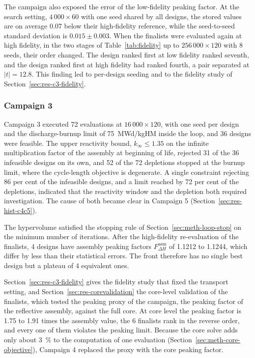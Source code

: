 The campaign also exposed the error of the low-fidelity peaking factor.
At the search setting, $4\,000\times60$ with one seed shared by all
designs, the stored values are on average 0.07 below their high-fidelity
reference, while the seed-to-seed standard deviation is
$0.015 \pm 0.003$.
When the finalists were evaluated again at high fidelity, in the two
stages of Table~\ref{tab:fidelity} up to $256\,000\times120$ with 8
seeds, their order changed. The design ranked first at low fidelity
ranked seventh, and the design ranked first at high fidelity had ranked
fourth, a pair separated at $|t| = 12.8$. This finding led to per-design
seeding and to the fidelity study of Section~\ref{sec:res-c3-fidelity}.

\subsubsection{Campaign 3}
\label{sec:res-hist-c3}
\label{sec:res-c3}\label{sec:res-c3doe}\label{tab:c3-census}\label{fig:c3-space}\label{sec:res-c3front}\label{fig:hv}\label{fig:plateau}\label{tab:c3-resolved}

Campaign 3 executed 72 evaluations at $16\,000\times120$, with one seed per
design and the discharge-burnup limit of \SI{75}{MWd/kgHM} inside the
loop, and 36 designs were feasible. The upper reactivity bound,
$k_\infty \le 1.35$ on the infinite multiplication factor of the assembly at beginning of life,
rejected 31 of the 36 infeasible designs on its own, and 52 of the 72
depletions stopped at the burnup limit, where the cycle-length
objective is degenerate. A single constraint rejecting 86 per cent of
the infeasible designs, and a limit reached by 72 per cent of the
depletions, indicated that the reactivity window and the depletion both
required investigation. The cause of both became clear in Campaign 5
(Section~\ref{sec:res-hist-c4c5}).

The hypervolume satisfied the stopping rule of
Section~\ref{sec:meth-loop-stop} on the minimum number of iterations.
After the high-fidelity re-evaluation of the finalists, 4 designs
have assembly peaking factors $F_{\Delta H}^\mathrm{asm}$ of 1.1212 to
1.1244, which differ by less than their statistical errors. The front
therefore has no single best design but a plateau of 4 equivalent
ones.

Section~\ref{sec:res-c3-fidelity} gives the fidelity study that fixed
the transport setting, and Section~\ref{sec:res-corevalidation} the
core-level validation of the finalists, which tested the peaking proxy
of the campaign, the peaking factor of the reflective assembly, against
the full core. At core level the peaking factor is 1.75 to 1.91 times
the assembly value, the 6 finalists rank in the reverse order, and every
one of them violates the peaking limit. Because the core solve adds only
about \SI{3}{\%} to the computation of one evaluation
(Section~\ref{sec:meth-core-objective}), Campaign 4 replaced the proxy
with the core peaking factor.

